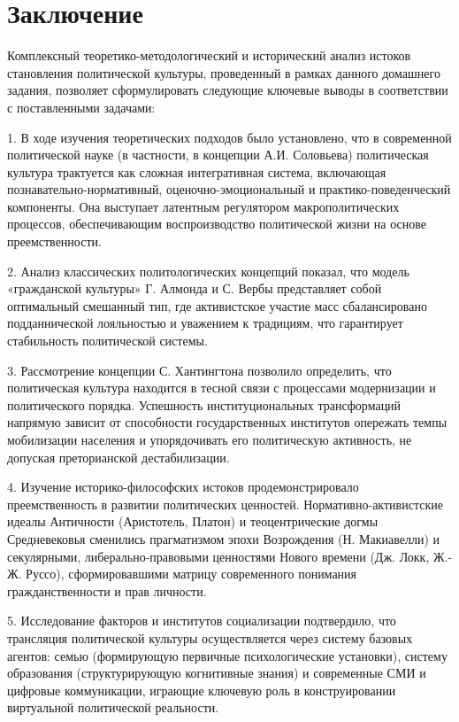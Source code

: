 \section*{Заключение}

Комплексный теоретико-методологический и исторический анализ истоков становления политической культуры, проведенный в рамках данного домашнего задания, позволяет сформулировать следующие ключевые выводы в соответствии с поставленными задачами:

1. В ходе изучения теоретических подходов было установлено, что в современной политической науке (в частности, в концепции А.И. Соловьева) политическая культура трактуется как сложная интегративная система, включающая познавательно-нормативный, оценочно-эмоциональный и практико-поведенческий компоненты. Она выступает латентным регулятором макрополитических процессов, обеспечивающим воспроизводство политической жизни на основе преемственности.

2. Анализ классических политологических концепций показал, что модель «гражданской культуры» Г. Алмонда и С. Вербы представляет собой оптимальный смешанный тип, где активистское участие масс сбалансировано подданнической лояльностью и уважением к традициям, что гарантирует стабильность политической системы.

3. Рассмотрение концепции С. Хантингтона позволило определить, что политическая культура находится в тесной связи с процессами модернизации и политического порядка. Успешность институциональных трансформаций напрямую зависит от способности государственных институтов опережать темпы мобилизации населения и упорядочивать его политическую активность, не допуская преторианской дестабилизации.

4. Изучение историко-философских истоков продемонстрировало преемственность в развитии политических ценностей. Нормативно-активистские идеалы Античности (Аристотель, Платон) и теоцентрические догмы Средневековья сменились прагматизмом эпохи Возрождения (Н. Макиавелли) и секулярными, либерально-правовыми ценностями Нового времени (Дж. Локк, Ж.-Ж. Руссо), сформировавшими матрицу современного понимания гражданственности и прав личности.

5. Исследование факторов и институтов социализации подтвердило, что трансляция политической культуры осуществляется через систему базовых агентов: семью (формирующую первичные психологические установки), систему образования (структурирующую когнитивные знания) и современные СМИ и цифровые коммуникации, играющие ключевую роль в конструировании виртуальной политической реальности.

